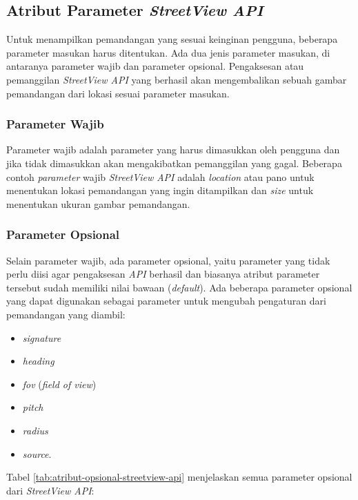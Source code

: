 

\subsection{Atribut Parameter {\it StreetView API}}
\label{subs:parameter}
Untuk menampilkan pemandangan yang sesuai keinginan pengguna, beberapa parameter masukan harus ditentukan. Ada dua jenis parameter masukan, di antaranya parameter wajib dan parameter opsional. Pengaksesan atau pemanggilan {\it StreetView API} yang berhasil akan mengembalikan sebuah gambar pemandangan dari lokasi sesuai parameter masukan.

\subsubsection{Parameter Wajib}
Parameter wajib adalah parameter yang harus dimasukkan oleh pengguna dan jika tidak dimasukkan akan mengakibatkan pemanggilan yang gagal. 
Beberapa contoh {\it parameter} wajib {\it StreetView API} adalah {\it location} atau pano untuk menentukan lokasi pemandangan yang ingin ditampilkan dan {\it size} untuk menentukan ukuran gambar pemandangan. 

\subsubsection{Parameter Opsional}
Selain parameter wajib, ada parameter opsional, yaitu parameter yang tidak perlu diisi agar pengaksesan {\it API} berhasil dan biasanya atribut parameter tersebut sudah memiliki nilai bawaan ({\it default}). Ada beberapa parameter opsional yang dapat digunakan sebagai parameter untuk mengubah pengaturan dari pemandangan yang diambil:
\begin{itemize}
	\item {\it signature}
	\item {\it heading}
	\item {\it fov} ({\it field of view})
	\item {\it pitch}
	\item {\it radius}
	\item {\it source}.
\end{itemize}
Tabel \ref{tab:atribut-opsional-streetview-api} menjelaskan semua parameter opsional dari \textit{StreetView API}:

